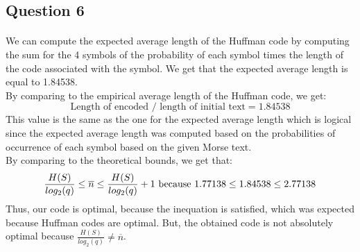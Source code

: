\documentclass[a4paper, 11pt, oneside]{article}
\begin{document}
\subsection{Question 6}
\paragraph{}We can compute the expected average length of the Huffman code by computing the sum for the 4 symbols of the probability of each symbol times the length of the code associated with the symbol.
We get that the expected average length is equal to 1.84538.\\
By comparing to the empirical average length of the Huffman code, we get:
$$\text{Length of encoded } / \text{ length of initial text} = 1.84538$$
This value is the same as the one for the expected average length which is logical since the expected average length was computed based on the probabilities of occurrence of each symbol based on the given Morse text.\\
By comparing to the theoretical bounds, we get that:\\
\begin{equation}
    \frac{H(S)}{log_2(q)} \leq \overline{n} \leq \frac{H(S)}{log_2(q)} + 1$ because $1.77138 \leq 1.84538 \leq 2.77138
\end{equation}
Thus, our code is optimal, because the inequation is satisfied, which was expected because Huffman codes are optimal. But, the obtained code is not absolutely optimal because $\frac{H(S)}{log_2(q)} \neq \overline{n}$.

\end{document}
